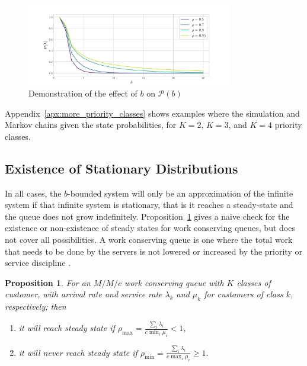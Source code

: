 \documentclass{article}
\newtheorem{prop}{Proposition}
\begin{document}
\begin{figure}
  \begin{center}
    \includegraphics[width=0.8\textwidth]{img/hitting_accuracy.pdf}
  \end{center}
  \caption{Demonstration of the effect of $b$ on $\mathcal{P}(b)$}
  \label{fig:hitting_accuracy}
\end{figure}

Appendix~\ref{apx:more_priority_classes} shows examples where the simulation and
Markov chains given the state probabilities, for $K = 2$, $K = 3$, and $K = 4$
priority classes.

\subsection{Existence of Stationary Distributions}\label{sec:stationary}
In all cases, the $b$-bounded system will only be an approximation of the
infinite system if that infinite system is stationary, that is it reaches a
steady-state and the queue does not grow indefinitely.
Proposition~\ref{thrm:steadystate} gives a naive check for the existence or
non-existence of steady states for work conserving queues, but does not cover
all possibilities. A work conserving queue is one where the total work that
needs to be done by the servers is not lowered or increased by the priority or
service discipline \cite{wolff70}.

\begin{prop}\label{thrm:steadystate}
For an $M/M/c$ work conserving queue with $K$ classes of customer, with arrival
rate and service rate $\lambda_k$ and  $\mu_k$ for customers of class $k$,
respectively; then
\begin{enumerate}
  \item it will reach steady state if
  $\rho_{\max} = \frac{\sum_i \lambda_i}{c \min_i \mu_i} < 1$,
  \item it will never reach steady state if
  $\rho_{\min} = \frac{\sum_i \lambda_i}{c \max_i \mu_i} \geq 1$.
\end{enumerate}
\end{prop}
\end{document}
